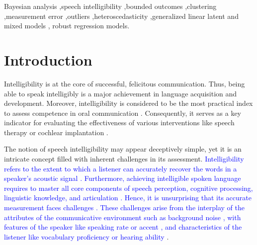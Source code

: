 \documentclass[
  authoryear,
  preprint,
  1p]{elsarticle}
\begin{document}
\begin{frontmatter}
\begin{keyword}
    Bayesian analysis \sep speech intelligibility \sep bounded
outcomes \sep clustering \sep measurement
error \sep outliers \sep heteroscedasticity \sep generalized linear
latent and mixed models \sep 
    robust regression models.
\end{keyword}
\end{frontmatter}
    
\section{Introduction}\label{sec-introduction}

Intelligibility is at the core of successful, felicitous communication.
Thus, being able to speak intelligibly is a major achievement in
language acquisition and development. Moreover, intelligibility is
considered to be the most practical index to assess competence in oral
communication \citep{Kent_et_al_1994}. Consequently, it serves as a key
indicator for evaluating the effectiveness of various interventions like
speech therapy or cochlear implantation \citep{Chin_et_al_2012}.

The notion of speech intelligibility may appear deceptively simple, yet
it is an intricate concept filled with inherent challenges in its
assessment. \textcolor{blue}{Intelligibility refers to the extent to which a listener
can accurately recover the words in a speaker's acoustic signal
\citep{Freeman_et_al_2017, vanHeuven_2008, Whitehill_et_al_2004}.
Furthermore, achieving intelligible spoken language requires to master
all core components of speech perception, cognitive processing,
linguistic knowledge, and articulation \citep{Freeman_et_al_2017}.
Hence, it is unsurprising that its accurate measurement faces challenges
\citep{Kent_et_al_1989}. These challenges arise from the interplay of
the attributes of the communicative environment such as background noise
\citep{Munro_1998}, with features of the speaker like speaking rate
\citep{Munro_et_al_1998} or accent
\citep{Jenkins_2000, Ockey_et_al_2016}, and characteristics of the
listener like vocabulary proficiency or hearing ability
\citep{Varonis_et_al_1985}}.
\end{document}
